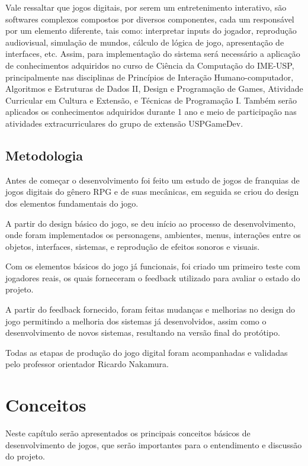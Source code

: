 	Vale ressaltar que jogos digitais, por serem um entretenimento interativo, são softwares complexos compostos por diversos componentes, cada um responsável por um elemento diferente, tais como: interpretar inputs do jogador, reprodução audiovisual, simulação de mundos, cálculo de lógica de jogo, apresentação de interfaces, etc. Assim, para implementação do sistema será necessário a aplicação de conhecimentos adquiridos no curso de Ciência da Computação do IME-USP, principalmente nas disciplinas de Princípios de Interação Humano-computador, Algoritmos e Estruturas de Dados II, Design e Programação de Games, Atividade Curricular em Cultura e Extensão, e Técnicas de Programação I. Também serão aplicados os conhecimentos adquiridos durante 1 ano e meio de participação nas atividades extracurriculares do grupo de extensão USPGameDev.

\section{Metodologia}

Antes de começar o desenvolvimento foi feito um estudo de jogos de franquias de jogos digitais do gênero RPG e de suas mecânicas, em seguida se criou do design dos elementos fundamentais do jogo.

	A partir do design básico do jogo, se deu início ao processo de desenvolvimento, onde foram implementados os personagens, ambientes, menus, interações entre os objetos, interfaces, sistemas, e reprodução de efeitos sonoros e visuais.

Com os elementos básicos do jogo já funcionais, foi criado um primeiro teste com jogadores reais, os quais forneceram o feedback utilizado para avaliar o estado do projeto.

A partir do feedback fornecido, foram feitas mudanças e melhorias no design do jogo permitindo a melhoria dos sistemas já desenvolvidos, assim como o desenvolvimento de novos sistemas, resultando na versão final do protótipo.

Todas as etapas de produção do jogo digital foram acompanhadas e validadas pelo professor orientador Ricardo Nakamura.

\chapter{Conceitos}

Neste capítulo serão apresentados os principais conceitos básicos de desenvolvimento de jogos, que serão importantes para o entendimento e discussão do projeto.

